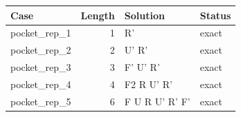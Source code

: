 \begin{tabular}{p{}rp{}p{}}
\hline
Case & Length & Solution & Status \\
\hline
pocket\_rep\_1 & 1 & R' & exact \\
pocket\_rep\_2 & 2 & U' R' & exact \\
pocket\_rep\_3 & 3 & F' U' R' & exact \\
pocket\_rep\_4 & 4 & F2 R U' R' & exact \\
pocket\_rep\_5 & 6 & F U R U' R' F' & exact \\
\hline
\end{tabular}
